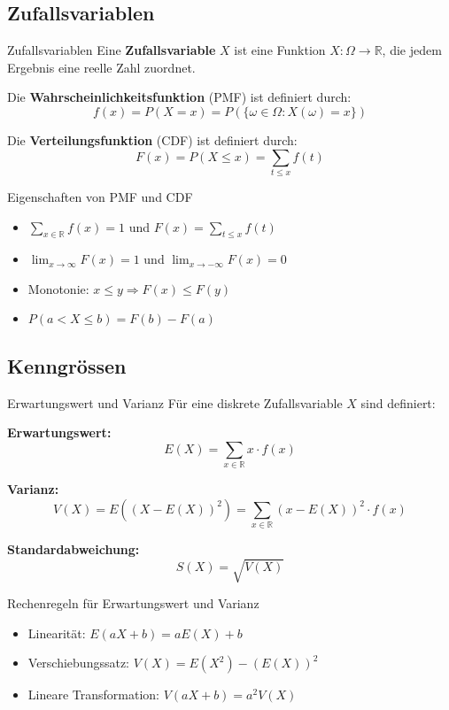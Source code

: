 \subsection{Zufallsvariablen}

\begin{definition}{Zufallsvariablen}
Eine \textbf{Zufallsvariable} $X$ ist eine Funktion $X: \Omega \rightarrow \mathbb{R}$, die jedem Ergebnis eine reelle Zahl zuordnet.

Die \textbf{Wahrscheinlichkeitsfunktion} (PMF) ist definiert durch:
$$f(x) = P(X = x) = P(\{\omega \in \Omega : X(\omega) = x\})$$

Die \textbf{Verteilungsfunktion} (CDF) ist definiert durch:
$$F(x) = P(X \leq x) = \sum_{t \leq x} f(t)$$
\end{definition}

\begin{theorem}{Eigenschaften von PMF und CDF}
\begin{itemize}
    \item $\sum_{x \in \mathbb{R}} f(x) = 1$ und $F(x) = \sum_{t \leq x} f(t)$
    \item $\lim_{x \to \infty} F(x) = 1$ und $\lim_{x \to -\infty} F(x) = 0$
    \item Monotonie: $x \leq y \Rightarrow F(x) \leq F(y)$
    \item $P(a < X \leq b) = F(b) - F(a)$
\end{itemize}
\end{theorem}

\subsection{Kenngrössen}

\begin{definition}{Erwartungswert und Varianz}
Für eine diskrete Zufallsvariable $X$ sind definiert:

\textbf{Erwartungswert:}
$$E(X) = \sum_{x \in \mathbb{R}} x \cdot f(x)$$

\textbf{Varianz:}
$$V(X) = E((X-E(X))^2) = \sum_{x \in \mathbb{R}} (x-E(X))^2 \cdot f(x)$$

\textbf{Standardabweichung:}
$$S(X) = \sqrt{V(X)}$$
\end{definition}

\begin{theorem}{Rechenregeln für Erwartungswert und Varianz}
\begin{itemize}
    \item Linearität: $E(aX + b) = aE(X) + b$
    \item Verschiebungssatz: $V(X) = E(X^2) - (E(X))^2$
    \item Lineare Transformation: $V(aX + b) = a^2V(X)$
\end{itemize}
\end{theorem}

